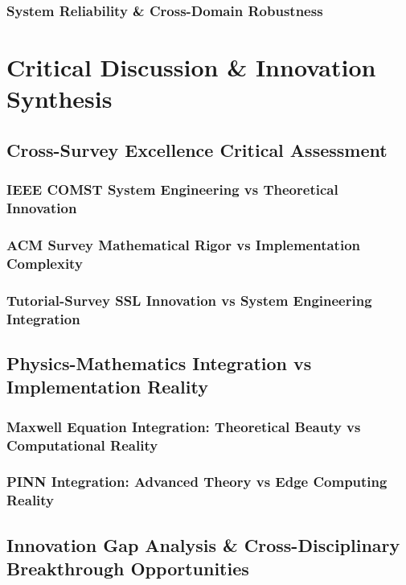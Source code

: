 \documentclass[journal]{IEEEtran}
\begin{document}
{\subsubsection{System Reliability \& Cross-Domain Robustness}

\section{Critical Discussion \& Innovation Synthesis}
\label{sec:discussion}

\subsection{Cross-Survey Excellence Critical Assessment}
\subsubsection{IEEE COMST System Engineering vs Theoretical Innovation}
\subsubsection{ACM Survey Mathematical Rigor vs Implementation Complexity}
\subsubsection{Tutorial-Survey SSL Innovation vs System Engineering Integration}

\subsection{Physics-Mathematics Integration vs Implementation Reality}
\subsubsection{Maxwell Equation Integration: Theoretical Beauty vs Computational Reality}
\subsubsection{PINN Integration: Advanced Theory vs Edge Computing Reality}

\subsection{Innovation Gap Analysis \& Cross-Disciplinary Breakthrough Opportunities}
}
\end{document}
